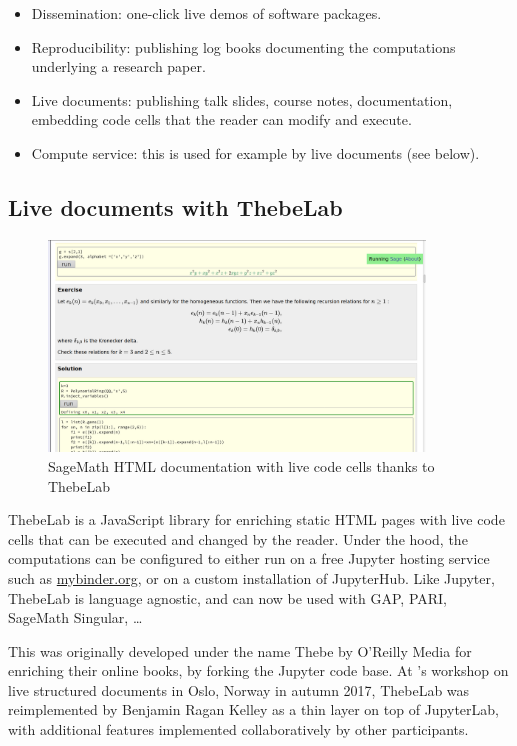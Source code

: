 \documentclass{deliverablereport}
\begin{document}
\begin{itemize}
\item Dissemination: one-click live demos of software packages.
\item Reproducibility: publishing log books documenting the computations underlying a research paper.
\item Live documents: publishing talk slides, course notes, documentation,
      embedding code cells that the reader can modify and execute.
\item Compute service: this is used for example by live documents (see below).
\end{itemize}

\subsection{Live documents with ThebeLab}

\begin{figure}[h]\label{thebelab}
\includegraphics[width=100mm]{thebelab.png}
\caption{SageMath HTML documentation with live code cells thanks to ThebeLab}
\end{figure}

ThebeLab is a JavaScript library for enriching static HTML pages with live code cells
that can be executed and changed by the reader.
Under the hood, the computations can be configured to either run on a free Jupyter hosting service
such as \url{mybinder.org}, or on a custom installation of JupyterHub. Like Jupyter, ThebeLab
is language agnostic, and can now be used with GAP, PARI, SageMath Singular, \ldots

This was originally developed under the name Thebe by O'Reilly Media
for enriching their online books, by forking the Jupyter code base.
At \ODK's workshop on live structured documents in Oslo, Norway in autumn 2017, ThebeLab was
reimplemented by Benjamin Ragan Kelley as a thin layer on top of JupyterLab, with additional
features implemented collaboratively by other participants.
\end{document}
